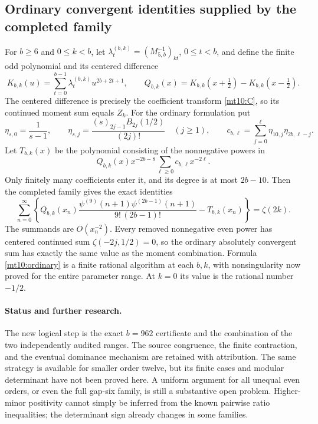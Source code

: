 \subsection{Ordinary convergent identities supplied by the completed family}

For $b\ge6$ and $0\le k<b$, let
$\lambda^{(b,k)}_t=(M_{5,b}^{-1})_{kt}$, $0\le t<b$, and define
the finite odd polynomial and its centered difference
\[
 K_{b,k}(u)=\sum_{t=0}^{b-1}\lambda^{(b,k)}_tu^{2b+2t+1},
 \qquad Q_{b,k}(x)=K_{b,k}(x+\tfrac12)-K_{b,k}(x-\tfrac12).
\]
The centered difference is precisely the coefficient transform
\eqref{mt10:C}, so its continued moment sum equals $Z_k$.
For the ordinary formulation put
\[
 \eta_{s,0}=\frac1{s-1},\qquad
 \eta_{s,j}=\frac{(s)_{2j-1}B_{2j}(1/2)}{(2j)!}\quad(j\ge1),
 \qquad c_{b,\ell}=\sum_{j=0}^{\ell}\eta_{10,j}\eta_{2b,\ell-j}.
\]
Let $T_{b,k}(x)$ be the polynomial consisting of the nonnegative
powers in
\[
             Q_{b,k}(x)x^{-2b-8}\sum_{\ell\ge0}c_{b,\ell}x^{-2\ell}.
\]
Only finitely many coefficients enter it, and its degree is at most
$2b-10$. Then the completed family gives the exact identities
\begin{equation}\label{mt10:ordinary}
 \boxed{\displaystyle
 \sum_{n=0}^{\infty}\left\{
 Q_{b,k}(x_n)
  \frac{\psi^{(9)}(n+1)\psi^{(2b-1)}(n+1)}{9!\,(2b-1)!}
       -T_{b,k}(x_n)\right\}=\zeta(2k).}
\end{equation}
The summands are $O(x_n^{-2})$. Every removed nonnegative even
power has centered continued sum $\zeta(-2j,1/2)=0$, so the
ordinary absolutely convergent sum has exactly the same value as
the moment combination. Formula \eqref{mt10:ordinary} is a finite
rational algorithm at each $b,k$, with nonsingularity now proved
for the entire parameter range. At $k=0$ its value is the rational
number $-1/2$.

\paragraph{Status and further research.}
The new logical step is the exact $b=962$ certificate and the
combination of the two independently audited ranges. The source
congruence, the finite contraction, and the eventual dominance
mechanism are retained with attribution. The same strategy is
available for smaller order twelve, but its finite cases and modular
determinant have not been proved here. A uniform argument for all
unequal even orders, or even the full gap-six family, is still a
substantive open problem. Higher-minor positivity cannot simply be
inferred from the known pairwise ratio inequalities; the determinant
sign already changes in some families.

